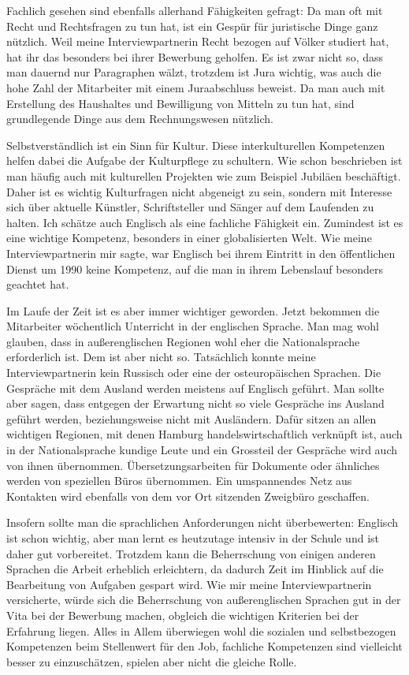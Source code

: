 \documentclass[12pt,headsepline,a4paper]{scrartcl}
\begin{document}
Fachlich gesehen sind ebenfalls allerhand Fähigkeiten gefragt:
Da man oft mit Recht und Rechtsfragen zu tun hat, ist ein Gespür für juristische Dinge ganz nützlich. Weil meine Interviewpartnerin Recht bezogen auf Völker studiert hat, hat ihr das besonders bei ihrer Bewerbung geholfen. Es ist zwar nicht so, dass man dauernd nur Paragraphen wälzt, trotzdem  ist Jura wichtig, was auch die hohe Zahl der Mitarbeiter mit einem Juraabschluss beweist.
Da man auch mit Erstellung des Haushaltes und Bewilligung von Mitteln zu tun hat, sind grundlegende Dinge aus dem Rechnungswesen nützlich.

Selbstverständlich  ist ein Sinn für Kultur. Diese interkulturellen Kompetenzen helfen dabei die Aufgabe der Kulturpflege zu schultern. Wie schon beschrieben ist man häufig auch mit kulturellen Projekten wie zum Beispiel Jubiläen beschäftigt. Daher ist es wichtig Kulturfragen nicht abgeneigt zu sein, sondern mit Interesse sich über aktuelle Künstler, Schriftsteller und Sänger auf dem Laufenden zu halten.
Ich schätze auch Englisch als eine fachliche Fähigkeit ein. Zumindest ist es eine wichtige Kompetenz, besonders in einer globalisierten Welt. Wie meine Interviewpartnerin mir sagte, war Englisch bei ihrem Eintritt in den öffentlichen Dienst um 1990 keine Kompetenz, auf die man in ihrem Lebenslauf besonders geachtet hat.

Im Laufe der Zeit ist es aber immer wichtiger geworden. Jetzt bekommen die Mitarbeiter wöchentlich Unterricht in der englischen Sprache. Man mag wohl glauben, dass in außerenglischen Regionen wohl eher die Nationalsprache erforderlich ist. Dem ist aber nicht so. Tatsächlich konnte meine Interviewpartnerin kein Russisch oder eine der osteuropäischen Sprachen. Die Gespräche mit dem Ausland werden meistens auf Englisch geführt. Man sollte aber sagen, dass entgegen der Erwartung nicht so viele Gespräche ins Ausland geführt werden, beziehungsweise nicht mit Ausländern. Dafür sitzen an allen wichtigen Regionen, mit denen Hamburg handelswirtschaftlich verknüpft ist, auch in der Nationalsprache kundige Leute und ein Grossteil der Gespräche wird auch von ihnen übernommen. Übersetzungsarbeiten für Dokumente oder ähnliches werden  von speziellen Büros übernommen. Ein umspannendes Netz aus Kontakten wird ebenfalls von dem vor Ort sitzenden Zweigbüro geschaffen.

Insofern sollte man die sprachlichen Anforderungen nicht überbewerten: Englisch ist schon wichtig, aber man lernt es heutzutage intensiv in der Schule und ist daher gut vorbereitet. Trotzdem kann die Beherrschung von einigen anderen Sprachen die Arbeit erheblich erleichtern, da dadurch Zeit im Hinblick auf die Bearbeitung von Aufgaben gespart wird. Wie mir meine Interviewpartnerin versicherte, würde sich die Beherrschung von außerenglischen Sprachen gut in der Vita bei der Bewerbung machen, obgleich die wichtigen  Kriterien bei der Erfahrung liegen.
Alles in Allem überwiegen wohl die sozialen und selbstbezogen Kompetenzen beim Stellenwert für den Job, fachliche Kompetenzen sind vielleicht besser zu einzuschätzen, spielen aber nicht die gleiche Rolle.
\end{document}
